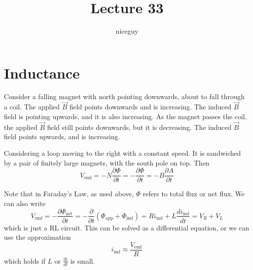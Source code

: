 \documentclass[12pt]{article}
\author{niceguy}
\title{Lecture 33}
\begin{document}
\maketitle

\section{Inductance}

\begin{ex}
    Consider a falling magnet with north pointing downwards, about to fall through a coil. The applied $\vec B$ field points downwards and is increasing. The induced $\vec B$ field is pointing upwards, and it is also increasing. As the magnet passes the coil, the applied $\vec B$ field still points downwards, but it is decreasing. The induced $\vec B$ field points upwards, and is increasing.
\end{ex}

\begin{ex}
    Considering a loop moving to the right with a constant speed. It is sandwiched by a pair of finitely large magnets, with the south pole on top. Then
    $$V_{\text{emf}} = -N\frac{\partial\Phi}{\partial t} = -\frac{\partial\Phi}{\partial t} = -B\frac{\partial A}{\partial t}$$
\end{ex}

Note that in Faraday's Law, as used above, $\Phi$ refers to total flux or net flux. We can also write
$$V_{\text{emf}} = -\frac{\partial\Phi_{\text{net}}}{\partial t} = -\frac{\partial}{\partial t}(\Phi_{\text{app}} + \Phi_{\text{ind}}) = Ri_{\text{ind}} + L\frac{di_{\text{ind}}}{dt} = V_R + V_L$$
which is just a RL circuit. This can be solved as a differential equation, or we can use the approximation
$$i_{\text{ind}} \approx \frac{V_{\text{emf}}}{R}$$
which holds if $L$ or $\frac{di}{dt}$ is small.
\end{document}
